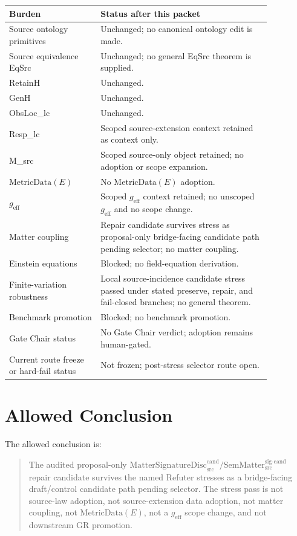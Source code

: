 \documentclass[11pt]{article}
\newcommand{\MetricData}{\mathrm{MetricData}}
\newcommand{\geff}{g_{\mathrm{eff}}}
\newcommand{\SemMatterSig}{\mathrm{SemMatter}_{\mathrm{src}}^{\mathrm{sig\text{-}cand}}}
\newcommand{\MatSigDisc}{\mathrm{MatterSignatureDisc}_{\mathrm{src}}^{\mathrm{cand}}}
\begin{document}
\begin{longtable}{p{0.30\linewidth}p{0.56\linewidth}}
\toprule
Burden & Status after this packet \\
\midrule
Source ontology primitives & Unchanged; no canonical ontology edit is made. \\
Source equivalence EqSrc & Unchanged; no general EqSrc theorem is supplied. \\
RetainH & Unchanged. \\
GenH & Unchanged. \\
ObsLoc\_lc & Unchanged. \\
Resp\_lc & Scoped source-extension context retained as context only. \\
M\_src & Scoped source-only object retained; no adoption or scope expansion. \\
\(\MetricData(E)\) & No \(\MetricData(E)\) adoption. \\
\(\geff\) & Scoped \(\geff\) context retained; no unscoped \(\geff\) and no scope change. \\
Matter coupling & Repair candidate survives stress as proposal-only bridge-facing candidate path pending selector; no matter coupling. \\
Einstein equations & Blocked; no field-equation derivation. \\
Finite-variation robustness & Local source-incidence candidate stress passed under stated preserve, repair, and fail-closed branches; no general theorem. \\
Benchmark promotion & Blocked; no benchmark promotion. \\
Gate Chair status & No Gate Chair verdict; adoption remains human-gated. \\
Current route freeze or hard-fail status & Not frozen; post-stress selector route open. \\
\bottomrule
\end{longtable}

\section{Allowed Conclusion}

The allowed conclusion is:

\begin{quote}
The audited proposal-only \(\MatSigDisc / \SemMatterSig\) repair candidate
survives the named Refuter stresses as a bridge-facing draft/control candidate
path pending selector. The stress pass is not source-law adoption, not
source-extension data adoption, not matter coupling, not \(\MetricData(E)\),
not a \(\geff\) scope change, and not downstream GR promotion.
\end{quote}
\end{document}

